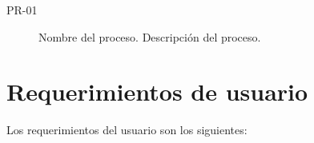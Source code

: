 \begin{description}
	\item[PR-01] Nombre del proceso. Descripción del proceso.
\end{description}

\section{Requerimientos de usuario}


Los requerimientos del usuario son los siguientes\FootnoteStatus:

\begin{requerimientosU}
\end{requerimientosU}
